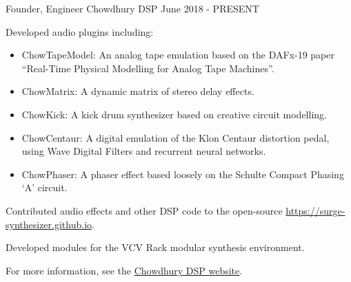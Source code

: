 

\begin{cventries}

  \cventry
    {Founder, Engineer} %
    {Chowdhury DSP} %
    {} %
    {June 2018 - PRESENT} %
    {
      \begin{cvitems} %
        \item {Developed audio plugins including:}
        \begin{itemize}
            \item {ChowTapeModel: An analog tape emulation based on the DAFx-19 paper ``Real-Time Physical Modelling for Analog Tape Machines''.}
            \item {ChowMatrix: A dynamic matrix of stereo delay effects.}
            \item {ChowKick: A kick drum synthesizer based on creative circuit modelling.}
            \item {ChowCentaur: A digital emulation of the Klon Centaur distortion pedal, using Wave Digital Filters and recurrent neural networks.}
            \item {ChowPhaser: A phaser effect based loosely on the Schulte Compact Phasing `A' circuit.}
        \end{itemize}
        \item {Contributed audio effects and other DSP code to the open-source \href{Surge Synthesizer project}{https://surge-synthesizer.github.io}.}
        \item {Developed modules for the VCV Rack modular synthesis environment.}
        \item {For more information, see the \href{https://chowdsp.com}{Chowdhury DSP website}.}
      \end{cvitems}
    }


\end{cventries}

